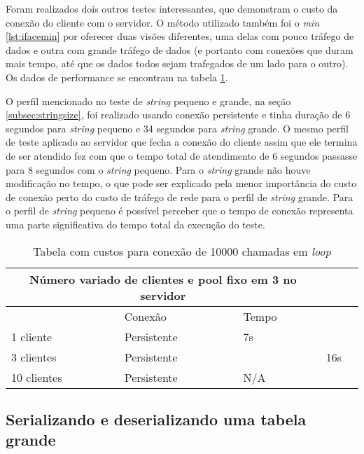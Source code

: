 \documentclass[11pt]{article}
\begin{document}
Foram realizados dois outros testes interessantes, que demonstram o custo da
conexão do cliente com o servidor. O método utilizado também foi o
\textit{min} \ref{lst:ifacemin} por oferecer duas visões diferentes, uma delas com
pouco tráfego de dados e outra com grande tráfego de dados (e portanto com
conexões que duram mais tempo, até que os dados todos sejam trafegados de um
lado para o outro). Os dados de performance se encontram na tabela
\ref{tab:perfpool}.

O perfil mencionado no teste de \textit{string} pequeno e grande, na seção
\ref{subsec:stringsize}, foi realizado usando conexão persistente e tinha
duração de 6 segundos para \textit{string} pequeno e 34 segundos para
\textit{string} grande. O mesmo perfil de teste aplicado ao servidor que fecha a
conexão do cliente assim que ele termina de ser atendido fez com que o tempo
total de atendimento de 6 segundos passasse para 8 segundos com o
\textit{string} pequeno. Para o \textit{string} grande não houve modificação no
tempo, o que pode ser explicado pela menor importância do custo de conexão perto
do custo de tráfego de rede para o perfil de \textit{string} grande. Para o
perfil de \textit{string} pequeno é possível perceber que o tempo de conexão
representa uma parte significativa do tempo total da execução do teste.

\renewcommand{\arraystretch}{2}
\begin{table}
\begin{center}
{\footnotesize \begin{tabular}{p{2.5cm} p{2.5cm} p{2.5cm} p{2.5cm} p{2.5cm}}
\hline
\multicolumn{3}{c}{Número variado de clientes e pool fixo em 3 no servidor} \\ \hline
~ & Conexão & Tempo \\ \hline
1 cliente & Persistente & 7s \\
3 clientes & Persistente & & 16s \\
10 clientes & Persistente & N/A \\
\hline
\end{tabular}}
\caption{Tabela com custos para conexão de 10000 chamadas em \textit{loop}}
\label{tab:perfpool}
\end{center}
\end{table}

\subsection{Serializando e deserializando uma tabela grande}\label{subsec:serdeser}
\end{document}
